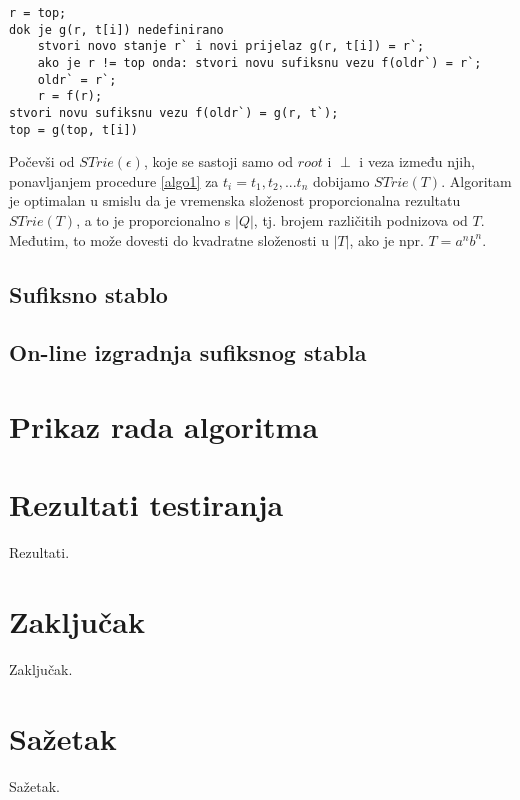 \documentclass[times, utf8, seminar, numeric]{fer}
\begin{document}
\begin{lstlisting}[caption=Izgradnja $STrie(T^i)$ iz $STrie(T^{i-1})$, label=algo1]
r = top;
dok je g(r, t[i]) nedefinirano
	stvori novo stanje r` i novi prijelaz g(r, t[i]) = r`;
	ako je r != top onda: stvori novu sufiksnu vezu f(oldr`) = r`;
	oldr` = r`;
	r = f(r);
stvori novu sufiksnu vezu f(oldr`) = g(r, t`);
top = g(top, t[i])
\end{lstlisting}
	
	Počevši od $STrie(\epsilon)$, koje se sastoji samo od $root$ i $\perp$ i veza između njih, ponavljanjem procedure \ref{algo1} za $t_i = t_1,t_2,...t_n$ dobijamo $STrie(T)$. Algoritam je optimalan u smislu da je vremenska složenost proporcionalna rezultatu $STrie(T)$, a to je proporcionalno s $|Q|$, tj. brojem različitih podnizova od $T$. Međutim, to može dovesti do kvadratne složenosti u $|T|$, ako je npr. $T=a^n b^n$.

\section{Sufiksno stablo}


\section{On-line izgradnja sufiksnog stabla}

\chapter{Prikaz rada algoritma}


\chapter{Rezultati testiranja}
Rezultati.

\chapter{Zaključak}
Zaključak.




\chapter{Sažetak}
Sažetak.
\end{document}
